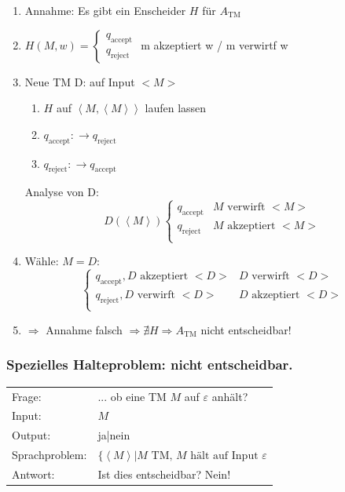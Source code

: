 \begin{enumerate}
	\item	Annahme: Es gibt ein Enscheider $H$ für $A_\text{TM}$
	\item	$H(M,w) = \begin{cases}
			q_\text{accept}\\
			q_\text{reject}
		\end{cases}$
		m akzeptiert w / m verwirtf w \\
	\item	Neue TM D: auf Input $<M>$ \begin{enumerate}
			\item $H$ auf $\left<M,\left<M\right>\right>$ laufen lassen
			\item $q_\text{accept} : \rightarrow q_\text{reject}$
			\item $q_\text{reject} : \rightarrow q_\text{accept}$
		\end{enumerate}
		Analyse von D: \[
			D(\left<M\right>) \begin{cases}
			q_\text{accept} & M \text{ verwirft } <M>\\
			q_\text{reject} & M \text{ akzeptiert } <M>\\
			\end{cases}
		\]
	\item Wähle: $M=D$: \[
			\begin{cases}
			q_\text{accept}, D \text{ akzeptiert } <D> & D \text{ verwirft } <D>\\
			q_\text{reject}, D \text{ verwirft } <D> & D \text{ akzeptiert } <D>\\
			\end{cases}
		\]
	\item	$\Rightarrow$ Annahme falsch $\Rightarrow \nexists H \Rightarrow A_\text{TM}$ nicht entscheidbar!
\end{enumerate}


\subsubsection{Spezielles Halteproblem: nicht entscheidbar.}

\begin{tabu}{l X}
	Frage: &... ob eine TM $M$ auf $\varepsilon$ anhält?\\
	Input: & $M$\\
	Output: & ja|nein\\
	Sprachproblem: &$ \{\left<M\right>|M \text{ TM, } M \text{ hält auf Input } \varepsilon$\\
	Antwort: &Ist dies entscheidbar? Nein!
\end{tabu}


